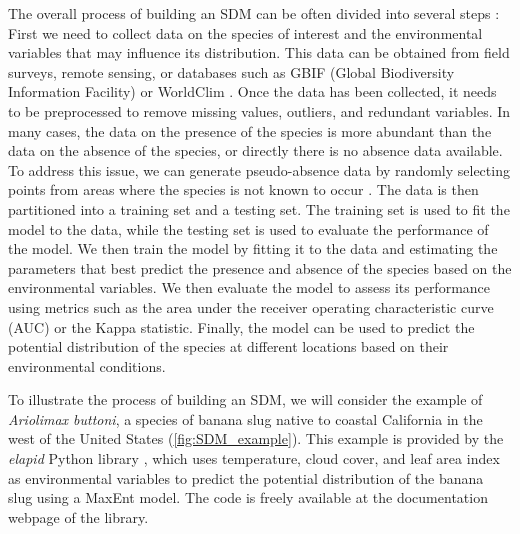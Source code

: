 The overall process of building an SDM can be often divided into several
steps \cite{Elith2006}: First we need to collect data on the species of
interest and the environmental variables that may influence its distribution.
This data can be obtained from field surveys, remote sensing, or databases such
as GBIF (Global Biodiversity Information Facility) \cite{GBIF} or WorldClim
\cite{WorldClim}. Once the data has been collected, it needs to be preprocessed
to remove missing values, outliers, and redundant variables. In many cases,
the data on the presence of the species is more abundant than the data on the
absence of the species, or directly there is no absence data available. To
address this issue, we can generate pseudo-absence data by randomly selecting
points from areas where the species is not known to occur
\cite{Iturbide2015}. The data is then partitioned into a training set and a
testing set. The training set is used to fit the model to the data, while the
testing set is used to evaluate the performance of the model. We then train the
model by fitting it to the data and estimating the parameters that best predict
the presence and absence of the species based on the environmental variables.
We then evaluate the model to assess its performance using metrics such as the
area under the receiver operating characteristic curve (AUC) or the Kappa
statistic. Finally, the model can be used to predict the potential
distribution of the species at different locations based on their environmental
conditions.

To illustrate the process of building an SDM, we will consider the example of
\textit{Ariolimax buttoni}, a species of banana slug native to coastal
California in the west of the United States (\cref{fig:SDM_example}). This
example is provided by the \textit{elapid} Python library \cite{Elapid},
which uses temperature, cloud cover, and leaf area index as environmental
variables to predict the potential distribution of the banana slug using a
MaxEnt model. The code is freely available at the documentation webpage of the
library.

